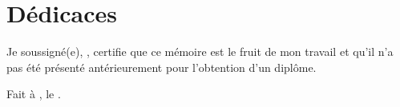 \chapter*{Dédicaces}

\begin{center}
\end{center}

Je soussigné(e), \authorName, certifie que ce mémoire est le fruit de mon travail et qu'il n'a pas été présenté antérieurement pour l'obtention d'un diplôme.

\vspace{1cm}

Fait à \university, le \signatureDate.

